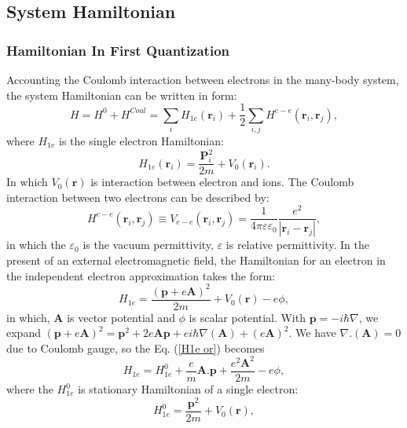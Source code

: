 \documentclass[12pt,english,a4paper]{article}
\begin{document}
	\subsection{System Hamiltonian}
	\subsubsection{Hamiltonian In First Quantization}
\quad Accounting the Coulomb interaction between electrons in the many-body system, the system Hamiltonian can be written in form:
	\begin{equation}
		H = H^0 +H^{Coul} = \sum_{i}H_{1e}(\textbf{r}_i) + \frac{1}{2}\sum_{i,j}H^{e-e}(\textbf{r}_i, \textbf{r}_j),
	\end{equation}
where $H_{1e}$ is the single electron Hamiltonian:
	\begin{equation}
		H_{1e}(\textbf{r}_i) = \frac{\textbf{P}_i^2}{2m} + V_0(\textbf{r}_i).
	\end{equation}
\quad In which $V_0 (\textbf{r})$ is interaction between electron and ions. The Coulomb interaction between two electrons can be described by:
	\begin{equation}
		\label{H ee}
		H^{e-e}(\textbf{r}_i, \textbf{r}_j) \equiv V_{e-e}(\textbf{r}_i, \textbf{r}_j) = \frac{1}{4\pi \varepsilon \varepsilon_0}\frac{e^2}{|\textbf{r}_i-\textbf{r}_j|},
	\end{equation}
in which the $\varepsilon_0$ is the vacuum permittivity, $\varepsilon$ is relative permittivity. In the present of an external electromagnetic field, the Hamiltonian for an electron in the independent electron approximation takes the form:
	\begin{equation}
		\label{H1e or}
		H_{1e} = \frac{(\textbf{p} + e \textbf{A})^2}{2m} + V_0(\textbf{r}) -e\phi,
	\end{equation}
in which, $\textbf{A}$ is vector potential and $\phi$ is scalar potential. With $\textbf{p} = - i\hbar\nabla$, we expand $(\textbf{p}+e\textbf{A})^2 = \textbf{p}^2 + 2e\textbf{A}\textbf{p} + ei \hbar \nabla(\textbf{A}) + (e\textbf{A})^2$. We have $\nabla.(\textbf{A}) = 0$ due to Coulomb gauge, so the Eq. (\ref{H1e or}) becomes
	\begin{equation}
		\label{expand H1e}
		H_{1e} = H^0_{1e} + \frac{e}{m} \textbf{A}.\textbf{p} + \frac{e^2 \textbf{A}^2}{2m} - e\phi,
	\end{equation}
where the $H^0_{1e}$ is stationary Hamiltonian of a single electron:
	\begin{equation}
		\label{H01e}
		H^0_{1e} = \frac{\textbf{p}^2}{2m} +V_0 (\textbf{r}),
	\end{equation}
\end{document}

